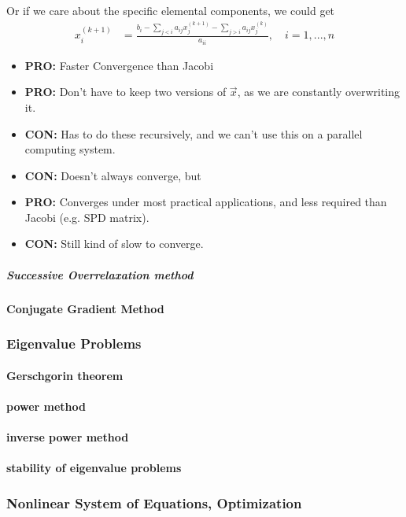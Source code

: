\documentclass[a4paper,12pt]{article} %
\begin{document}
Or if we care about the specific elemental components, we could get
\begin{align}
	x_i^{(k+1)} &= \frac{b_i - \sum_{j<i} a_{ij}x_j^{(k+1)} - \sum_{j>i} a_{ij}x_j^{(k)}}{a_{ii}}, \quad i = 1,..., n
\end{align}
\begin{itemize}
	\item \textbf{PRO:} Faster Convergence than Jacobi
	\item \textbf{PRO:} Don't have to keep two versions of $\vec{x}$, as we are constantly overwriting it.
	\item \textbf{CON:} Has to do these recursively, and we can't use this on a parallel computing system.
	\item \textbf{CON:} Doesn't always converge, but
	\item \textbf{PRO:} Converges under most practical applications, and less required than Jacobi (e.g. SPD matrix).
	\item \textbf{CON:} Still kind of slow to converge. 
\end{itemize}
\subparagraph{Successive Overrelaxation method}
\paragraph{Conjugate Gradient Method}

\subsubsection{Eigenvalue Problems}
\paragraph{Gerschgorin theorem}
\paragraph{power method} 
\paragraph{inverse power method} 
\paragraph{stability of eigenvalue problems}

\subsubsection{Nonlinear System of Equations, Optimization}
\end{document}
